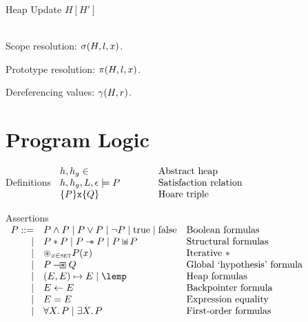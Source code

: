 \documentclass[a4paper,notitlepage]{report}
\begin{document}
  \begin{display}{Heap Update $H[H']$}
     \\
     \\
  \end{display}

  \begin{display}{Scope resolution: $\sigma(H,l,x)$.}
    \vg
    \rsep
  \end{display}
  \begin{display}{Prototype resolution: $\pi(H,l,x)$.}
    \vg
    \rsep
  \end{display}
  \begin{display}{Dereferencing values: $\gamma(H,r)$.}
    ~
    ~
  \end{display}

\chapter{Program Logic}
\newcommand{\defline}[2]{#1 & \qquad & \text{#2}\\}
\begin{display}{Definitions}
  $\begin{array}{lll}
    \defline{h,h_g \in}{Abstract heap}
    \defline{h,h_g,L,\env \satisfies P}{Satisfaction relation}
    \defline{\tr{P}{\js{x}}{Q}}{Hoare triple}
  \end{array}$
\end{display}

\newcommand{\asrtline}[3][\pipe]{#1 & #2 & \text{#3}\\}
\begin{display}{Assertions}
  $\begin{array}{rll}
    \asrtline[P ::=]{P \land P \pipe P \lor P \pipe \lnot P \pipe \ltrue \pipe
    \lfalse}{Boolean formulas}
    \asrtline{P \sep P \pipe P \wand P \pipe P \sepish P}{Structural formulas}
    \asrtline{\bigsep_{x \in \T{set}} P(x)}{Iterative $\sep$}
    \asrtline{P \boxwand Q}{Global `hypothesis' formula}
    \asrtline{(E,E) \pointsto E \pipe \lemp}{Heap formulas}
    \asrtline{E \bp E}{Backpointer formula}
    \asrtline{E = E}{Expression equality}
    \asrtline{\forall X \st P \pipe \exists X \st P}{First-order formulas}
  \end{array}$
\end{display}
\end{document}
